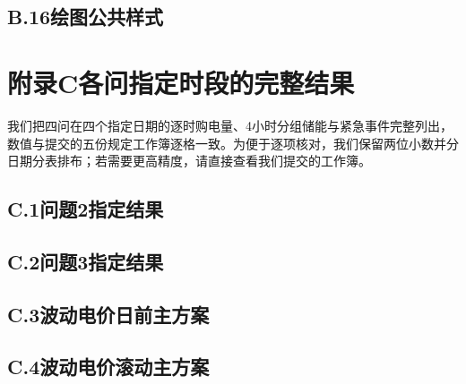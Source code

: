\documentclass[UTF8,fontset=none,a4paper,zihao=-4]{ctexart}
\begin{document}
\subsection*{B.16\quad 绘图公共样式}

\endgroup

\clearpage
\section*{附录C\quad 各问指定时段的完整结果}
我们把四问在四个指定日期的逐时购电量、4小时分组储能与紧急事件完整列出，数值与提交的五份规定工作簿逐格一致。为便于逐项核对，我们保留两位小数并分日期分表排布；若需要更高精度，请直接查看我们提交的工作簿。
\begingroup\setlength{\intextsep}{3pt}\captionsetup{skip=2.5pt}
\subsection*{C.1\quad 问题2指定结果}









\subsection*{C.2\quad 问题3指定结果}









\subsection*{C.3\quad 波动电价日前主方案}





\subsection*{C.4\quad 波动电价滚动主方案}





\endgroup
\clearpage
\end{document}
